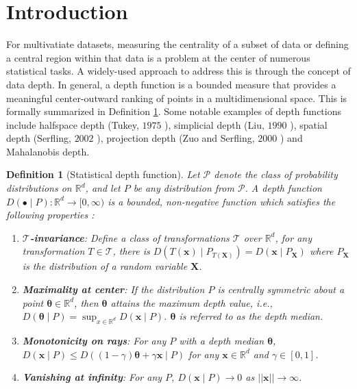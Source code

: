 \documentclass[final,3p,times]{elsarticle}
\newtheorem{thm}{\bf Definition}[section]
\newcommand{\vecx}{\mathbf{x}}
\newcommand{\vecX}{\mathbf{X}}
\newcommand{\vectheta}{\boldsymbol\theta}
\begin{document}
\section{Introduction}
For multivatiate datasets, measuring the centrality of a subset of data or defining a central region within that data is a problem at the center of numerous statistical tasks. A widely-used approach to address this is through the concept of data depth. In general, a depth function is a bounded measure that provides a meaningful center-outward ranking of points in a multidimensional space. This is formally summarized in Definition \ref{def:DATADEPTH}. Some notable examples of depth functions include halfspace depth (Tukey, $1975$ \cite{Tukey1975}), simplicial depth (Liu, $1990$ \cite{liu1990notion}), spatial depth (Serfling, $2002$ \cite{serfling2002depth}), projection depth (Zuo and Serfling, $2000$ \cite{zuo2000general}) and Mahalanobis depth.
\begin{thm}[Statistical depth function]\label{def:DATADEPTH}
    Let $\mathcal{P}$ denote the class of probability distributions on $\mathbb{R}^d$, and let $P$ be any distribution from $\mathcal{P}$. A depth function $D(\bullet\mid P):\mathbb{R}^d\to[0,\infty)$ is a bounded, non-negative function which satisfies the following properties \cite{zuo2000general}:
    \begin{enumerate}[(P1)]
        \item \textbf{$\mathcal{T}$-invariance}: Define a class of transformations $ \mathcal{T} $ over $\mathbb{R}^d$, for any transformation $T\in\mathcal{T}$, there is $D(T(\vecx) \mid P_{T(\vecX)}) = D(\vecx \mid P_{\vecX})$ where $P_\vecX$ is the distribution of a random variable $\vecX$.
        \item \textbf{Maximality at center}: If the distribution $P$ is centrally symmetric about a point $\vectheta\in \mathbb{R}^d$, then $\vectheta$ attains the maximum depth value, i.e., $D(\vectheta\mid P)=\sup_{x\in \mathbb{R}^d}D(\vecx\mid P)$. $\vectheta$ is referred to as the depth median.
        \item  \textbf{Monotonicity on rays}: For any $P$ with a depth median $\vectheta$, $D(\vecx\mid P)\leq D((1-\gamma)\vectheta+\gamma\vecx\mid P)$ for any $\vecx\in\mathbb{R}^d$ and $\gamma\in [0,1]$.
        \item  \textbf{Vanishing at infinity}: For any $P$, $D(\vecx\mid P)\to 0$ as $||\vecx||\to \infty$.
    \end{enumerate}
\end{thm}
\end{document}

